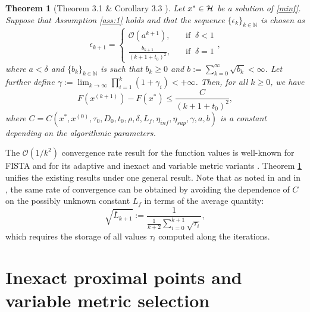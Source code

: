 \documentclass[conference]{IEEEtran}
\newtheorem{theorem}{Theorem}
\begin{document}
\medskip

\begin{theorem}[Theorem 3.1 \& Corollary 3.3 \cite{SAGE-FISTA}]\label{th:convergence}
Let $x^*\in\mathcal H$ be a solution of \eqref{minf}. Suppose that Assumption \ref{ass:1} holds and that the sequence $\{\epsilon_k\}_{k\in\mathbb{N}}$ is chosen as
\begin{equation}\label{eq:prefixed3}
\epsilon_{k+1}=\begin{cases}
\mathcal{O}(a^{k+1}), \quad &\text{if } \ \delta <1\\
\displaystyle \frac{b_{k+1}}{(k+1+t_0)^2}, \quad &\text{if } \ \delta =1
\end{cases},
\end{equation}
where $a<\delta$ and $\{b_k\}_{k\in\mathbb{N}}$ is such that $b_k\geq 0$ and $b:=\sum_{k=0}^{\infty}\sqrt{b_k}<\infty$. Let further define  $\gamma:=\lim_{k\to\infty}\prod_{i=1}^k (1+\gamma_i)<+\infty$. Then, for all $k\geq 0$, we have
\begin{equation*}
F(x^{(k+1)})-F(x^*)\leq \frac{C}{(k+1+t_0)^2},
\end{equation*} 
where $C=C(x^*,x^{(0)},\tau_0,D_0,t_0,\rho,\delta,L_f,\eta_{inf},\eta_{sup},\gamma, a, b)$ is a constant depending on the algorithmic parameters.
\end{theorem}

\medskip

The $\mathcal{O}(1/k^2)$ convergence rate result for the function values is well-known for FISTA \cite{Beck-Teboulle-2009b} and for its adaptive \cite{Scheinberg-2014} and inexact and variable metric variants \cite{Schmidt2011,Bonettini2018a}. Theorem \ref{th:convergence} unifies the existing results  under one general result. Note that as noted in \cite{Calatroni-Chambolle-2019} and in \cite[Remark 3.4]{SAGE-FISTA}, the same rate of convergence can be obtained by avoiding the dependence of $C$ on the possibly unknown constant $L_f$ in terms of the average quantity:
\begin{equation}   \label{eq:Lbar}
\sqrt{\bar{L}_{k+1}} := \frac{1}{\frac{1}{k+2} \sum\limits_{i=0}^{k+1}  \sqrt{\tau_i}},
\end{equation}
which requires the storage of all values $\tau_i$ computed along the iterations.



\section{Inexact proximal points and variable metric selection}  \label{sec:choice}
\end{document}
